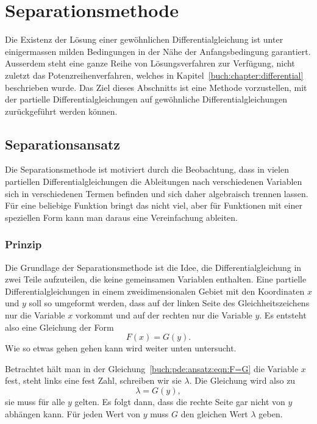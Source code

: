 %
%
%
\section{Separationsmethode
\label{buch:pde:section:separation}}
Die Existenz der Lösung einer gewöhnlichen Differentialgleichung
ist unter einigermassen milden Bedingungen in der Nähe der
Anfangsbedingung garantiert.
Ausserdem steht eine ganze Reihe von Lösungsverfahren zur
Verfügung, nicht zuletzt das Potenzreihenverfahren, welches in
Kapitel~\ref{buch:chapter:differential} beschrieben wurde.
Das Ziel dieses Abschnitts ist eine Methode vorzustellen, mit
der partielle Differentialgleichungen auf gewöhnliche
Differentialgleichungen zurückgeführt werden können.

%
%
\subsection{Separationsansatz}
Die Separationsmethode ist motiviert durch die Beobachtung, dass in
vielen partiellen Differentialgleichungen die Ableitungen nach
verschiedenen Variablen sich in verschiedenen Termen befinden und
sich daher algebraisch trennen lassen.
Für eine beliebige Funktion bringt das nicht viel, aber für
Funktionen mit einer speziellen Form kann man daraus eine Vereinfachung
ableiten.

%
%
\subsubsection{Prinzip}
Die Grundlage der Separationsmethode ist die Idee, die Differentialgleichung
in zwei Teile aufzuteilen, die keine gemeinsamen Variablen enthalten.
Eine partielle Differentialgleichungen in einem zweidimensionalen
Gebiet mit den Koordinaten $x$ und $y$ soll so umgeformt
werden, dass auf der linken Seite des Gleichheitszeichens nur
die Variable $x$ vorkommt und auf der rechten nur die Variable $y$.
Es entsteht also eine Gleichung der Form
\begin{equation}
F(x) = G(y).
\label{buch:pde:ansatz:eqn:F=G}
\end{equation}
Wie so etwas gehen gehen kann wird weiter unten untersucht.

Betrachtet hält man in der Gleichung~\eqref{buch:pde:ansatz:eqn:F=G}
die Variable $x$ fest, steht links eine fest Zahl, schreiben wir 
sie $\lambda$.
Die Gleichung wird also zu
\[
\lambda = G(y),
\]
sie muss für alle $y$ gelten.
Es folgt dann, dass die rechte Seite gar nicht von $y$ abhängen kann.
Für jeden Wert von $y$ muss $G$ den gleichen Wert $\lambda$ geben.

